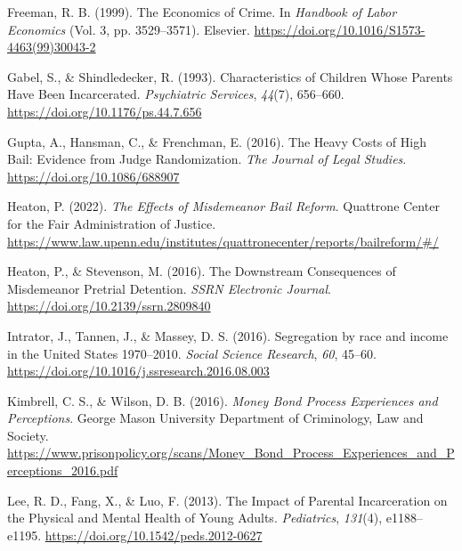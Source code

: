 \documentclass[
  letterpaper,
  DIV=11,
  numbers=noendperiod]{scrartcl}
\newlength{\cslhangindent}
\newlength{\cslentryspacingunit} %
\newenvironment{CSLReferences}[2] %
 {%
  \setlength{\parindent}{0pt}
  \ifodd #1
  \let\oldpar\par
  \def\par{\hangindent=\cslhangindent\oldpar}
  \fi
  \setlength{\parskip}{#2\cslentryspacingunit}
 }%
 {}
\begin{document}
\begin{CSLReferences}{1}{0}
\leavevmode{}%
Freeman, R. B. (1999). The {Economics} of {Crime}. In \emph{Handbook of
{Labor Economics}} (Vol. 3, pp. 3529--3571). {Elsevier}.
\url{https://doi.org/10.1016/S1573-4463(99)30043-2}

\leavevmode{}%
Gabel, S., \& Shindledecker, R. (1993). Characteristics of {Children
Whose Parents Have Been Incarcerated}. \emph{Psychiatric Services},
\emph{44}(7), 656--660. \url{https://doi.org/10.1176/ps.44.7.656}

\leavevmode{}%
Gupta, A., Hansman, C., \& Frenchman, E. (2016). The {Heavy Costs} of
{High Bail}: {Evidence} from {Judge Randomization}. \emph{The Journal of
Legal Studies}. \url{https://doi.org/10.1086/688907}

\leavevmode{}%
Heaton, P. (2022). \emph{The {Effects} of {Misdemeanor Bail Reform}}.
{Quattrone Center for the Fair Administration of Justice}.
\url{https://www.law.upenn.edu/institutes/quattronecenter/reports/bailreform/\#/}

\leavevmode{}%
Heaton, P., \& Stevenson, M. (2016). The {Downstream Consequences} of
{Misdemeanor Pretrial Detention}. \emph{SSRN Electronic Journal}.
\url{https://doi.org/10.2139/ssrn.2809840}

\leavevmode{}%
Intrator, J., Tannen, J., \& Massey, D. S. (2016). Segregation by race
and income in the {United States} 1970--2010. \emph{Social Science
Research}, \emph{60}, 45--60.
\url{https://doi.org/10.1016/j.ssresearch.2016.08.003}

\leavevmode{}%
Kimbrell, C. S., \& Wilson, D. B. (2016). \emph{Money {Bond Process
Experiences} and {Perceptions}}. {George Mason University Department of
Criminology, Law and Society}.
\url{https://www.prisonpolicy.org/scans/Money_Bond_Process_Experiences_and_Perceptions_2016.pdf}

\leavevmode{}%
Lee, R. D., Fang, X., \& Luo, F. (2013). The {Impact} of {Parental
Incarceration} on the {Physical} and {Mental Health} of {Young Adults}.
\emph{Pediatrics}, \emph{131}(4), e1188--e1195.
\url{https://doi.org/10.1542/peds.2012-0627}


\end{CSLReferences}
\end{document}
